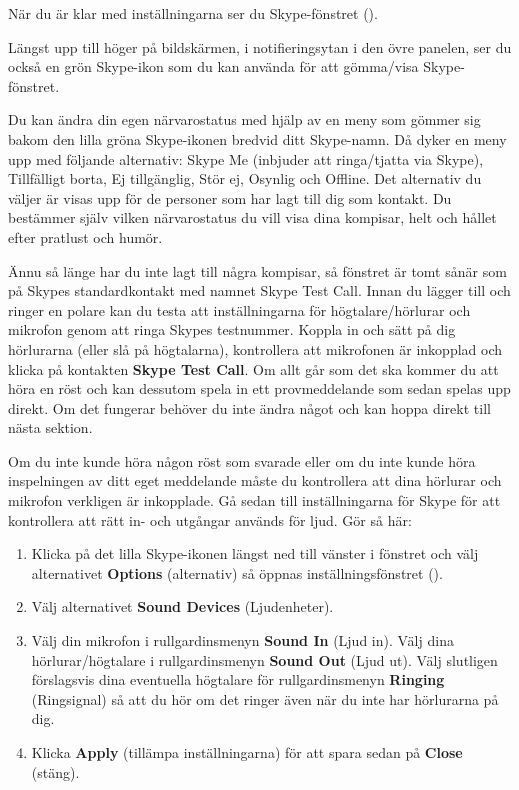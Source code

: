 \documentclass[a4paper,final]{memoir} %
\begin{document}
När du är klar med inställningarna ser du Skype-fönstret (). 

Längst upp till höger på bildskärmen, i notifieringsytan i den övre panelen, ser du också en grön Skype-ikon som du kan använda för att gömma/visa Skype-fönstret.

Du kan ändra din egen närvarostatus med hjälp av en meny som gömmer sig bakom den lilla gröna Skype-ikonen bredvid ditt Skype-namn. Då dyker en meny upp med följande alternativ: Skype Me (inbjuder att ringa/tjatta via Skype), Tillfälligt borta, Ej tillgänglig, Stör ej, Osynlig och Offline. Det alternativ du väljer är visas upp för de personer som har lagt till dig som kontakt. Du bestämmer själv vilken närvarostatus du vill visa dina kompisar, helt och hållet efter pratlust och humör.

Ännu så länge har du inte lagt till några kompisar, så fönstret är tomt sånär som på Skypes standardkontakt med namnet Skype Test Call. Innan du lägger till och ringer en polare kan du testa att inställningarna för högtalare/hörlurar och mikrofon genom att ringa Skypes testnummer. Koppla in och sätt på dig hörlurarna (eller slå på högtalarna), kontrollera att mikrofonen är inkopplad och klicka på kontakten \textbf{Skype Test Call}. Om allt går som det ska kommer du att höra en röst och kan dessutom spela in ett provmeddelande som sedan spelas upp direkt. Om det fungerar behöver du inte ändra något och kan hoppa direkt till nästa sektion.

Om du inte kunde höra någon röst som svarade eller om du inte kunde höra inspelningen av ditt eget meddelande måste du kontrollera att dina hörlurar och mikrofon verkligen är inkopplade. Gå sedan till inställningarna för Skype för att kontrollera att rätt in- och utgångar används för ljud. Gör så här:

\begin{enumerate}

\item Klicka på det lilla Skype-ikonen längst ned till vänster i fönstret och välj alternativet \textbf{Options} (alternativ) så öppnas inställningsfönstret (). 
\item Välj alternativet \textbf{Sound Devices} (Ljudenheter).  
\item Välj din mikrofon i rullgardinsmenyn \textbf{Sound In} (Ljud in). Välj dina hörlurar/högtalare i rullgardinsmenyn \textbf{Sound Out} (Ljud ut). Välj slutligen förslagsvis dina eventuella högtalare för rullgardinsmenyn \textbf{Ringing} (Ringsignal) så att du hör om det ringer även när du inte har hörlurarna på dig.
\item Klicka \textbf{Apply} (tillämpa inställningarna) för att spara sedan på \textbf{Close} (stäng).
\end{enumerate}
\end{document}
